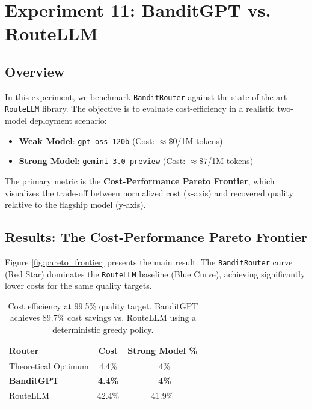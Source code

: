 \section{Experiment 11: BanditGPT vs. RouteLLM}
\label{sec:exp11_comparison}

\subsection{Overview}
In this experiment, we benchmark \texttt{BanditRouter} against the state-of-the-art \texttt{RouteLLM} library. The objective is to evaluate cost-efficiency in a realistic two-model deployment scenario:
\begin{itemize}
    \item \textbf{Weak Model}: \texttt{gpt-oss-120b} (Cost: $\approx\$0$/1M tokens)
    \item \textbf{Strong Model}: \texttt{gemini-3.0-preview} (Cost: $\approx\$7$/1M tokens)
\end{itemize}

The primary metric is the \textbf{Cost-Performance Pareto Frontier}, which visualizes the trade-off between normalized cost (x-axis) and recovered quality relative to the flagship model (y-axis).

\subsection{Results: The Cost-Performance Pareto Frontier}
Figure \ref{fig:pareto_frontier} presents the main result. The \texttt{BanditRouter} curve (Red Star) dominates the \texttt{RouteLLM} baseline (Blue Curve), achieving significantly lower costs for the same quality targets.



\begin{table}[h]
\centering
\begin{tabular}{lcc}
\toprule
\textbf{Router} & \textbf{Cost} & \textbf{Strong Model \%} \\
\midrule
Theoretical Optimum & 4.4\% & ~4\% \\
\textbf{BanditGPT} & \textbf{4.4\%} & \textbf{~4\%} \\
RouteLLM & 42.4\% & 41.9\% \\
\bottomrule
\end{tabular}
\caption{Cost efficiency at 99.5\% quality target. BanditGPT achieves 89.7\% cost savings vs. RouteLLM using a deterministic greedy policy.}
\label{tab:iso_quality_cost}
\end{table}

